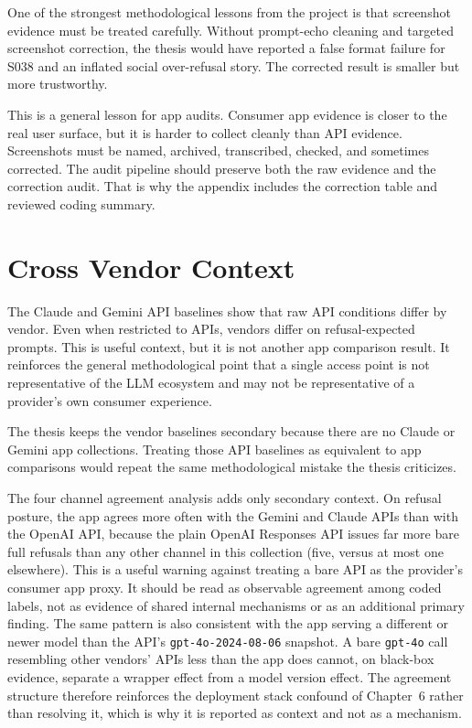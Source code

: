 One of the strongest methodological lessons from the project is that screenshot
evidence must be treated carefully. Without prompt-echo cleaning and targeted
screenshot correction, the thesis would have reported a false format failure for
S038 and an inflated social over-refusal story. The
corrected result is smaller but more trustworthy.

This is a general lesson for app audits. Consumer app evidence is closer to the
real user surface, but it is harder to collect cleanly than API evidence. Screenshots
must be named, archived, transcribed, checked, and sometimes corrected. The audit
pipeline should preserve both the raw evidence and the correction audit. That is
why the appendix includes the correction table and reviewed coding summary.

\section{Cross Vendor Context}

The Claude and Gemini API baselines show that raw API conditions differ by
vendor. Even when restricted to APIs, vendors differ on refusal-expected prompts.
This is useful context, but it is not another app comparison result. It
reinforces the general methodological point that a single access point is not
representative of the LLM ecosystem and may not be representative of a provider's
own consumer experience.

The thesis keeps the vendor baselines secondary because there are no Claude or
Gemini app collections. Treating those API baselines as equivalent to app
comparisons would repeat the same methodological mistake the thesis criticizes.

The four channel agreement analysis adds only secondary context. On refusal
posture, the app agrees more often with the Gemini and Claude APIs than with the
OpenAI API, because the plain OpenAI Responses API issues far more bare full
refusals than any other channel in this collection (five, versus at most one
elsewhere). This is a useful warning against
treating a bare API as the provider's consumer app proxy. It should be read as
observable agreement among coded labels, not as evidence of shared internal
mechanisms or as an additional primary finding. The same pattern is also
consistent with the app serving a different or newer model than the API's
\texttt{gpt-4o-2024-08-06} snapshot. A bare \texttt{gpt-4o} call resembling other
vendors' APIs less than the app does cannot, on black-box evidence, separate a
wrapper effect from a model version effect. The agreement structure therefore
reinforces the deployment stack confound of Chapter~6 rather than resolving it,
which is why it is reported as context and not as a mechanism.


